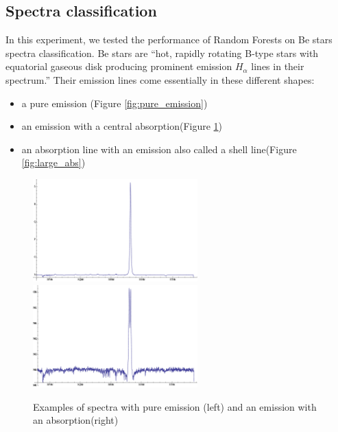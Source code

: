 \documentclass[thesis=B,english]{FITthesis}[2012/10/20]
\begin{document}
\subsection{Spectra classification}
In this experiment, we tested the performance of Random Forests on Be stars spectra classification. Be stars are ``hot, rapidly rotating B-type stars with equatorial gaseous disk producing prominent emission $H_\alpha$ lines in their spectrum.''\cite{bromovabeclass} Their emission lines come essentially in these different shapes:
\begin{itemize}
\item a pure emission (Figure \ref{fig:pure_emission})
\item an emission with a central absorption(Figure \ref{fig:small_abs})
\item an absorption line with an emission also called a shell line(Figure \ref{fig:large_abs})
\end{itemize}
\begin{figure}
\includegraphics[width=180pt]{emission_spectrum}
\label{fig:pure_emission}
\quad
\includegraphics[width=180pt]{small_abs_spectrum}
\caption[Examples of spectra containing pure emission and an emission with an absorption]{Examples of spectra with pure emission (left) and an emission with an absorption(right)}
\label{fig:small_abs}
\end{figure}
\end{document}
